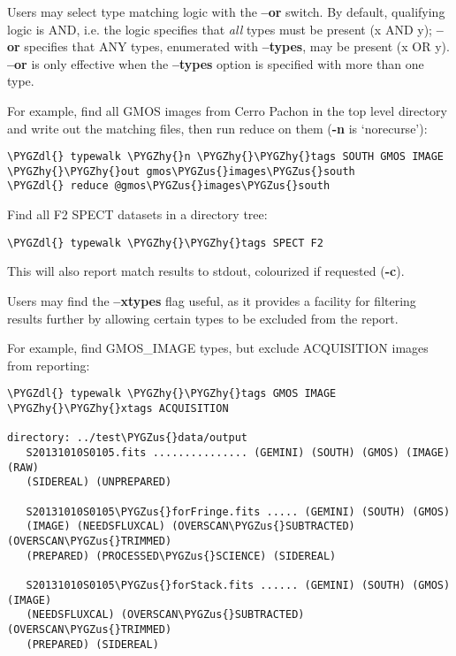 \documentclass[letterpaper,10pt,english]{sphinxmanual}
\def\PYGZus{\char`\_}
\def\PYGZdl{\char`\$}
\def\PYGZhy{\char`\-}
\begin{document}
Users may select type matching logic with the \textbf{--or} switch. By default,
qualifying logic is AND, i.e. the logic specifies that \emph{all} types must be
present (x AND y); \textbf{--or} specifies that ANY types, enumerated with
\textbf{--types}, may be present (x OR y). \textbf{--or} is only effective when the
\textbf{--types} option is specified with more than one type.

For example, find all GMOS images from Cerro Pachon in the top level
directory and write out the matching files, then run reduce on them
(\textbf{-n} is `norecurse'):

\begin{Verbatim}[commandchars=\\\{\}]
\PYGZdl{} typewalk \PYGZhy{}n \PYGZhy{}\PYGZhy{}tags SOUTH GMOS IMAGE \PYGZhy{}\PYGZhy{}out gmos\PYGZus{}images\PYGZus{}south
\PYGZdl{} reduce @gmos\PYGZus{}images\PYGZus{}south
\end{Verbatim}

Find all F2 SPECT datasets in a directory tree:

\begin{Verbatim}[commandchars=\\\{\}]
\PYGZdl{} typewalk \PYGZhy{}\PYGZhy{}tags SPECT F2
\end{Verbatim}

This will also report match results to stdout, colourized if requested (\textbf{-c}).

Users may find the \textbf{--xtypes} flag useful, as it provides a facility for
filtering results further by allowing certain types to be excluded from the
report.

For example, find GMOS\_IMAGE types, but exclude ACQUISITION images from reporting:

\begin{Verbatim}[commandchars=\\\{\}]
\PYGZdl{} typewalk \PYGZhy{}\PYGZhy{}tags GMOS IMAGE \PYGZhy{}\PYGZhy{}xtags ACQUISITION

directory: ../test\PYGZus{}data/output
   S20131010S0105.fits ............... (GEMINI) (SOUTH) (GMOS) (IMAGE) (RAW)
   (SIDEREAL) (UNPREPARED)

   S20131010S0105\PYGZus{}forFringe.fits ..... (GEMINI) (SOUTH) (GMOS)
   (IMAGE) (NEEDSFLUXCAL) (OVERSCAN\PYGZus{}SUBTRACTED) (OVERSCAN\PYGZus{}TRIMMED)
   (PREPARED) (PROCESSED\PYGZus{}SCIENCE) (SIDEREAL)

   S20131010S0105\PYGZus{}forStack.fits ...... (GEMINI) (SOUTH) (GMOS) (IMAGE)
   (NEEDSFLUXCAL) (OVERSCAN\PYGZus{}SUBTRACTED) (OVERSCAN\PYGZus{}TRIMMED)
   (PREPARED) (SIDEREAL)
\end{Verbatim}
\end{document}
